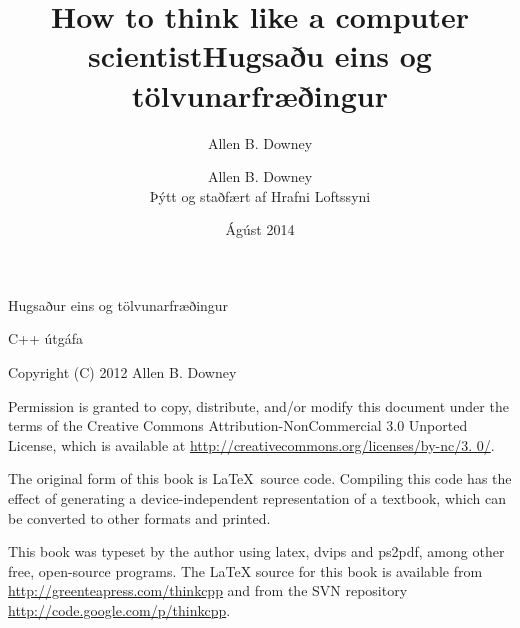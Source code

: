 \documentclass{book}
\title{How to think like a computer scientist}
\author{Allen B. Downey}
\date{}
\begin{document}
\title {Hugsaðu eins og tölvunarfræðingur}
\author {Allen B. Downey \\
Þýtt og staðfært af Hrafni Loftssyni}
\date {Ágúst 2014}
\maketitle

\vspace{2in}
\begin{center}
{\Large Hugsaður eins og tölvunarfræðingur}

C++ útgáfa
\vspace{0.25in}

Copyright (C) 2012  Allen B. Downey
\end{center}
\vspace{0.25in}

Permission is granted to copy, distribute, and/or modify this document
under the terms of the Creative Commons Attribution-NonCommercial 3.0 Unported
License, which is available at \url{http://creativecommons.org/licenses/by-nc/3.
0/}.

The original form of this book is \LaTeX\ source code.  Compiling this
code has the effect of generating a device-independent representation
of a textbook, which can be converted to other formats and printed.

This book was typeset by the author using latex, dvips and ps2pdf,
among other free, open-source programs.
The LaTeX source for this book is available from
\url{http://greenteapress.com/thinkcpp} and from the SVN repository
\url{http://code.google.com/p/thinkcpp}.


\frontmatter
\tableofcontents

\mainmatter
















\appendix


\printindex
\end{document}
